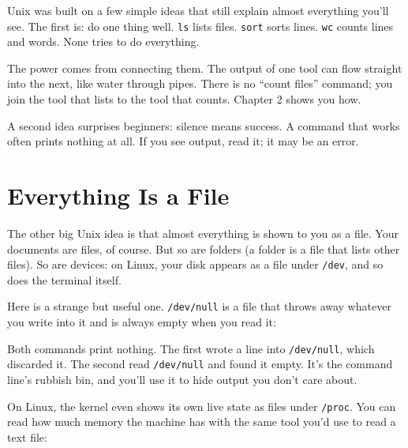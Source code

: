 Unix was built on a few simple ideas that still explain almost everything you'll see. The first is: do one thing well. \texttt{ls} lists files. \texttt{sort} sorts lines. \texttt{wc} counts lines and words. None tries to do everything.

The power comes from connecting them. The output of one tool can flow straight into the next, like water through pipes. There is no ``count files'' command; you join the tool that lists to the tool that counts. Chapter 2 shows you how.

A second idea surprises beginners: silence means success. A command that works often prints nothing at all. If you see output, read it; it may be an error.

\section{Everything Is a File}\label{01-the-machine-behind-the-terminal:everything-is-a-file}

The other big Unix idea is that almost everything is shown to you as a file. Your documents are files, of course. But so are folders (a folder is a file that lists other files). So are devices: on Linux, your disk appears as a file under \texttt{/dev}, and so does the terminal itself.


Here is a strange but useful one. \texttt{/dev/null} is a file that throws away whatever you write into it and is always empty when you read it:

\begin{codeblock}

\begin{Shaded}
\begin{Highlighting}[]
  \OperatorTok{\textgreater{}}
\end{Highlighting}
\end{Shaded}

\end{codeblock}

Both commands print nothing. The first wrote a line into \texttt{/dev/null}, which discarded it. The second read \texttt{/dev/null} and found it empty. It's the command line's rubbish bin, and you'll use it to hide output you don't care about.


On Linux, the kernel even shows its own live state as files under \texttt{/proc}. You can read how much memory the machine has with the same tool you'd use to read a text file:

